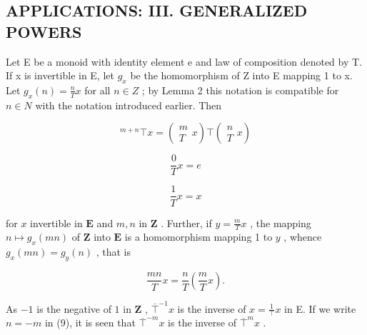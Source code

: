 \subsection{APPLICATIONS: III. GENERALIZED POWERS}

Let E be a monoid with identity element e and law of composition denoted by T. If x is invertible in E, let \(g_{x}\) be the homomorphism of Z into E mapping 1 to x. Let \(g_{x}(n) = \frac{n}{T} x\) for all \(n \in Z\) ; by Lemma 2 this notation is compatible for \(n \in N\) with the notation introduced earlier. Then

\[
{ } ^ { m + n } \top x = \left( \begin{array} { c } m \\ T \end{array} x \right) \top \left( \begin{array} { c } n \\ T \end{array} x \right)\tag{9}
\]

\[
\frac {0}{T} x = e\tag{10}
\]

\[
\frac {1}{T} x = x\tag{11}
\]

for \(x\) invertible in \(\mathbf{E}\) and \(m, n\) in \(\mathbf{Z}\) . Further, if \(y = \frac{m}{T} x\) , the mapping \(n \mapsto g_x(mn)\) of \(\mathbf{Z}\) into \(\mathbf{E}\) is a homomorphism mapping 1 to \(y\) , whence \(g_x(mn) = g_y(n)\) , that is

\[
\frac {m n}{T} x = \frac {n}{T} \left(\frac {m}{T} x\right).\tag{12}
\]

As \(-1\) is the negative of \(1\) in \(\mathbf{Z}\) , \(\overline{\top}^{-1}x\) is the inverse of \(x = \frac{1}{\top} x\) in E. If we write \(n = -m\) in (9), it is seen that \(\overline{\top}^{-m}x\) is the inverse of \(\overline{\top}^{m}x\) .

